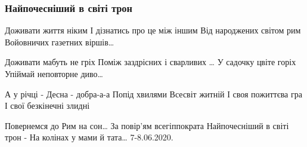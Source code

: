  
 
 

\subsubsection{Найпочесніший в світі трон}

Доживати життя ніким
І дізнатись про це між іншим
Від народжених світом рим
Войовничих газетних віршів…

Доживати мабуть не гріх
Поміж заздрісних і сварливих
… У садочку цвіте горіх
Упіймай неповторне диво…

А у річці - Десна - добра-а-а
Попід хвилями Всесвіт житній
І своя пожиттєва гра
І свої безкінечні злидні

Повернемся до Рим на сон…
За повір’ям всегіппократа
Найпочесніший в світі трон -
На колінах у мами й тата…
7-8.06.2020. 
